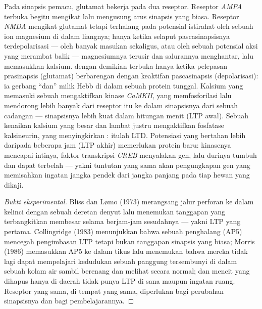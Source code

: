 \begin{proposition}\label{prop:b3:learning-memory:nmda}
%
Pada sinapsis pemacu, glutamat bekerja pada dua reseptor. Reseptor
\emph{AMPA} terbuka begitu mengikat lalu mengusung arus
sinapsis yang biasa. Reseptor \emph{NMDA} mengikat glutamat tetapi
terhalang pada potensial istirahat oleh sebuah ion magnesium di dalam liangnya; hanya ketika
selaput pascasinapsisnya terdepolarisasi --- oleh banyak masukan sekaligus, atau
oleh sebuah potensial aksi yang merambat balik --- magnesiumnya terusir
dan salurannya menghantar, lalu memasukkan kalsium.  dengan demikian
terbuka hanya ketika pelepasan prasinapsis (glutamat) berbarengan dengan
keaktifan pascasinapsis (depolarisasi): ia gerbang ``dan'' milik Hebb di dalam
sebuah protein tunggal. Kalsium yang memasuki sebuah \emph{}
mengaktifkan kinase \emph{CaMKII}, yang memfosforilasi 
lalu mendorong lebih banyak dari reseptor itu ke dalam sinapsisnya dari sebuah cadangan --- sinapsisnya
lebih kuat dalam hitungan menit (LTP awal). Sebuah kenaikan kalsium yang besar dan lambat
justru mengaktifkan fosfatase kalsineurin, yang menyingkirkan : itulah LTD. Potensiasi yang bertahan lebih daripada beberapa jam (LTP akhir)
memerlukan protein baru: kinasenya mencapai intinya, faktor transkripsi
\emph{CREB} menyalakan gen, lalu durinya tumbuh dan dapat terbelah ---
yakni tuntutan yang sama akan pengungkapan gen yang memisahkan ingatan jangka pendek
dari jangka panjang pada tiap hewan yang dikaji.
\end{proposition}

\begin{proof}[Bukti eksperimental]
Bliss dan L\o mo (1973) merangsang jalur perforan ke dalam
 kelinci dengan sebuah deretan denyut lalu menemukan tanggapan
yang terbangkitkan membesar selama berjam-jam sesudahnya --- yakni LTP yang pertama. Collingridge
(1983) menunjukkan bahwa sebuah penghalang  (AP5) mencegah
pengimbasan LTP tetapi bukan tanggapan sinapsis yang biasa; Morris (1986)
memasukkan AP5 ke dalam  tikus lalu menemukan bahwa mereka tidak lagi
dapat mempelajari kedudukan sebuah panggung tersembunyi di dalam sebuah kolam air sambil
berenang dan melihat secara normal; dan mencit yang 
dihapus hanya di daerah   tidak punya LTP di sana
maupun ingatan ruang. Reseptor yang sama, di tempat yang sama, diperlukan
bagi perubahan sinapsisnya dan bagi pembelajarannya.
\end{proof}

